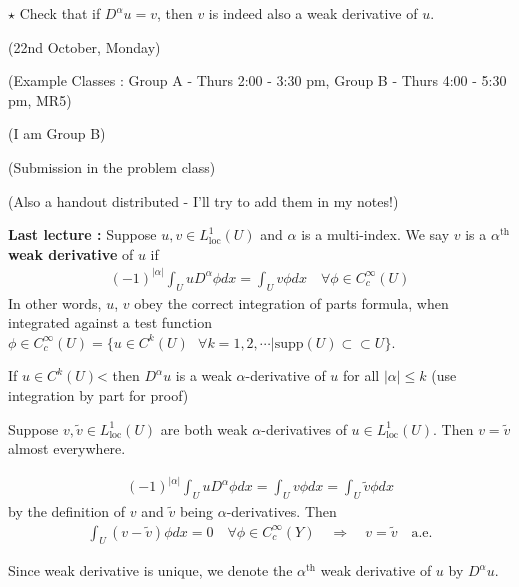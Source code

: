 \documentclass[12pt,a4paper]{report}
\newenvironment{proof}
{\begin{changemargin}{1cm}{0.5cm} 
	}%
	{\end{changemargin}
}
\begin{document}
$\star$ Check that if $D^{\alpha} u = v$, then $v$ is indeed also a weak derivative of $u$.
\s

\newday

(22nd October, Monday)
\s

(Example Classes : Group A - Thurs 2:00 - 3:30 pm, Group B - Thurs 4:00 - 5:30 pm, MR5)

(I am Group B)

(Submission in the problem class)

(Also a handout distributed - I'll try to add them in my notes!)
\s

\textbf{Last lecture :} Suppose $u,v\in L^1_{\text{loc}}(U)$ and $\alpha$ is a multi-index. We say $v$ is a \textbf{$\alpha^{\text{th}}$ weak derivative} of $u$ if
\begin{align*}
(-1)^{|\alpha|} \int_{U} uD^{\alpha} \phi dx = \int_U v\phi dx \quad \forall \phi \in C^{\infty}_c(U)
\end{align*}
In other words, $u$, $v$ obey the correct integration of parts formula, when integrated against a test function $\phi \in C^{\infty}_c(U) = \{u\in C^k(U) \,\,\,\, \forall k=1,2,\cdots | \text{supp}(U) \subset \subset U \}$.
\s

If $u\in C^k(U)$< then $D^{\alpha} u$ is a weak $\alpha$-derivative of $u$ for all $|\alpha| \leq k$ (use integration by part for proof)
\s

\newcommand{\loc}{L^1_{\text{loc}}}

\lem Suppose $v,\tilde{v} \in \loc (U)$ are both weak $\alpha$-derivatives of $u\in \loc (U)$. Then $v= \tilde{v}$ almost everywhere.
\begin{proof}
\pf \begin{align*}
(-1)^{|\alpha|} \int_U uD^{\alpha} \phi dx = \int_U v \phi dx = \int_U \tilde{v} \phi dx
\end{align*}
by the definition of $v$ and $\tilde{v}$ being $\alpha$-derivatives. Then
\begin{align*}
\int_U (v-\tilde{v}) \phi dx =0 \quad \forall \phi \in C^{\infty}_c (Y) \quad \Rightarrow \quad v= \tilde{v} \quad \text{a.e.}
\end{align*}

\eop
\end{proof}
\s

Since weak derivative is unique, we denote the $\alpha^{\text{th}}$ weak derivative of $u$ by $D^{\alpha} u$.
\end{document}
